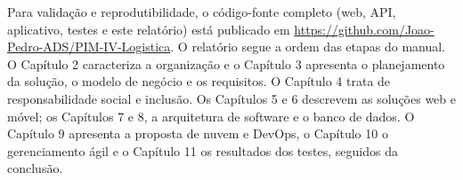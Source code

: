 Para validação e reprodutibilidade, o código-fonte completo (web, API, aplicativo, testes e este relatório) está publicado em \url{https://github.com/Joao-Pedro-ADS/PIM-IV-Logistica}. O relatório segue a ordem das etapas do manual. O Capítulo 2 caracteriza a organização e o Capítulo 3 apresenta o planejamento da solução, o modelo de negócio e os requisitos. O Capítulo 4 trata de responsabilidade social e inclusão. Os Capítulos 5 e 6 descrevem as soluções web e móvel; os Capítulos 7 e 8, a arquitetura de software e o banco de dados. O Capítulo 9 apresenta a proposta de nuvem e DevOps, o Capítulo 10 o gerenciamento ágil e o Capítulo 11 os resultados dos testes, seguidos da conclusão.
